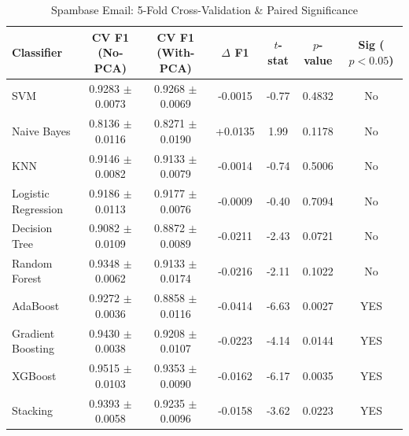 \documentclass[12pt,a4paper]{article}
\begin{document}
\begin{table}[H]
\centering
\footnotesize
\caption{Spambase Email: 5-Fold Cross-Validation \& Paired Significance}
\begin{tabular}{lcccccc}
\toprule
\textbf{Classifier} & \textbf{CV F1 (No-PCA)} & \textbf{CV F1 (With-PCA)} & \textbf{$\Delta$ F1} & \textbf{$t$-stat} & \textbf{$p$-value} & \textbf{Sig ($p<0.05$)} \\
\midrule
SVM & 0.9283 $\pm$ 0.0073 & 0.9268 $\pm$ 0.0069 & -0.0015 & -0.77 & 0.4832 & No \\
Naive Bayes & 0.8136 $\pm$ 0.0116 & 0.8271 $\pm$ 0.0190 & +0.0135 & 1.99 & 0.1178 & No \\
KNN & 0.9146 $\pm$ 0.0082 & 0.9133 $\pm$ 0.0079 & -0.0014 & -0.74 & 0.5006 & No \\
Logistic Regression & 0.9186 $\pm$ 0.0113 & 0.9177 $\pm$ 0.0076 & -0.0009 & -0.40 & 0.7094 & No \\
Decision Tree & 0.9082 $\pm$ 0.0109 & 0.8872 $\pm$ 0.0089 & -0.0211 & -2.43 & 0.0721 & No \\
Random Forest & 0.9348 $\pm$ 0.0062 & 0.9133 $\pm$ 0.0174 & -0.0216 & -2.11 & 0.1022 & No \\
AdaBoost & 0.9272 $\pm$ 0.0036 & 0.8858 $\pm$ 0.0116 & -0.0414 & -6.63 & 0.0027 & YES \\
Gradient Boosting & 0.9430 $\pm$ 0.0038 & 0.9208 $\pm$ 0.0107 & -0.0223 & -4.14 & 0.0144 & YES \\
XGBoost & 0.9515 $\pm$ 0.0103 & 0.9353 $\pm$ 0.0090 & -0.0162 & -6.17 & 0.0035 & YES \\
Stacking & 0.9393 $\pm$ 0.0058 & 0.9235 $\pm$ 0.0096 & -0.0158 & -3.62 & 0.0223 & YES \\
\bottomrule
\end{tabular}
\end{table}
\end{document}
